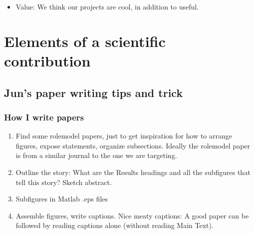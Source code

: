 \documentclass[letterpaper,10pt,english]{sphinxmanual}
\begin{document}
\begin{itemize}
\begin{description}
\begin{itemize}
\end{itemize}

\end{description}

\item {} 
\sphinxAtStartPar
Value: We think our projects are cool, in addition to useful.
\sphinxhyphen{} 

\end{itemize}


\chapter{Elements of a scientific contribution}
\label{\detokenize{02Elements:elements-of-a-scientific-contribution}}\label{\detokenize{02Elements::doc}}

\section{Jun’s paper writing tips and trick}
\label{\detokenize{PaperWritingTips:jun-s-paper-writing-tips-and-trick}}\label{\detokenize{PaperWritingTips:paperwritingtips}}\label{\detokenize{PaperWritingTips::doc}}

\subsection{How I write papers}
\label{\detokenize{PaperWritingTips:how-i-write-papers}}\begin{enumerate}
%
\setcounter{enumi}{-1}
\item {} 
\sphinxAtStartPar
Find some role\sphinxhyphen{}model papers, just to get inspiration for how to arrange figures, expose statements, organize subsections. Ideally the role\sphinxhyphen{}model paper is from a similar journal to the one we are targeting.

\item {} 
\sphinxAtStartPar
Outline the story: What are the Results headings and all the subfigures that tell this story? Sketch abstract.

\item {} 
\sphinxAtStartPar
Subfigures in Matlab .eps files

\item {} 
\sphinxAtStartPar
Assemble figures, write captions. Nice meaty captions: A good paper can be followed by reading captions alone (without reading Main Text).

\end{enumerate}
\end{document}
